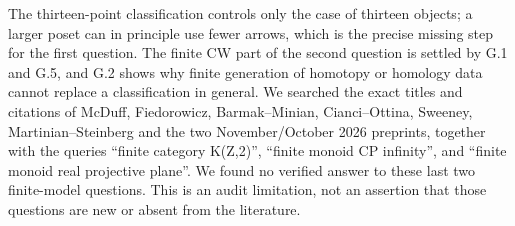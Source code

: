 The thirteen-point classification controls only the case of thirteen objects; a larger poset can in principle use fewer arrows, which is the precise missing step for the first question. The finite CW part of the second question is settled by G.1 and G.5, and G.2 shows why finite generation of homotopy or homology data cannot replace a classification in general. We searched the exact titles and citations of McDuff, Fiedorowicz, Barmak--Minian, Cianci--Ottina, Sweeney, Martinian--Steinberg and the two November/October 2026 preprints, together with the queries ``finite category K(Z,2)'', ``finite monoid CP infinity'', and ``finite monoid real projective plane''. We found no verified answer to these last two finite-model questions. This is an audit limitation, not an assertion that those questions are new or absent from the literature.
